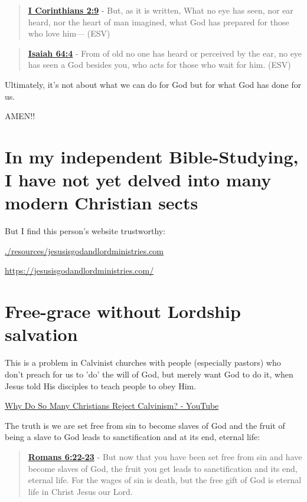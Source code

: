 \documentclass[11pt]{article}
\begin{document}
\begin{quote}
\textbf{\href{https://www.biblegateway.com/passage/?search=1\%20Corinthians\%202\%3A9\&version=ESV}{I Corinthians 2:9}} - But, as it is written, What no eye has seen, nor ear heard, nor the heart of man imagined, what God has prepared for those who love him— (ESV)
\end{quote}

\begin{quote}
\textbf{\href{https://www.biblegateway.com/passage/?search=Isaiah\%2064\%3A4\&version=ESV}{Isaiah 64:4}} - From of old no one has heard or perceived by the ear, no eye has seen a God besides you, who acts for those who wait for him. (ESV)
\end{quote}

Ultimately, it's not about what we can do for God but for what God has done for us.

AMEN!!

\section{In my independent Bible-Studying, I have not yet delved into many modern Christian sects}
\label{sec:org41dc234}

But I find this person's website trustworthy:

\url{./resources/jesusisgodandlordministries.com}

\url{https://jesusisgodandlordministries.com/}

\section{Free-grace without Lordship salvation}
\label{sec:orgbfe633c}
This is a problem in Calvinist churches with people (especially pastors)
who don't preach for us to 'do' the will of God, but merely want God to do it, when Jesus told His disciples to teach people to obey Him.

\href{https://www.youtube.com/watch?v=Rvvdx4i2TK8}{Why Do So Many Christians Reject Calvinism? - YouTube}

The truth is we are set free from sin to become slaves of God and the fruit of being a slave to God leads to sanctification and at its end, eternal life:

\begin{quote}
\textbf{\href{https://www.biblegateway.com/passage/?search=Romans\%206\%3A22-23\&version=ESV}{Romans 6:22-23}} - But now that you have been set free from sin and have become slaves of God, the fruit you get leads to sanctification and its end, eternal life. For the wages of sin is death, but the free gift of God is eternal life in Christ Jesus our Lord.
\end{quote}
\end{document}
